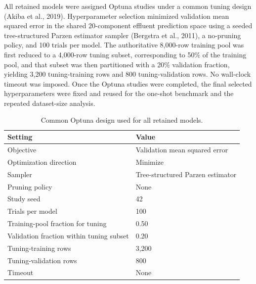 \documentclass[a4paper,fleqn]{cas-sc}
\newenvironment{revblock}{}{}
\newenvironment{revblockr24}{}{}
\begin{document}
\begin{revblock}
\begin{revblockr24}
All retained models were assigned Optuna studies under a common tuning design (Akiba et al., 2019). Hyperparameter selection minimized validation mean squared error in the shared 20-component effluent prediction space using a seeded tree-structured Parzen estimator sampler (Bergstra et al., 2011), a no-pruning policy, and 100 trials per model. The authoritative 8,000-row training pool was first reduced to a 4,000-row tuning subset, corresponding to 50\% of the training pool, and that subset was then partitioned with a 20\% validation fraction, yielding 3,200 tuning-training rows and 800 tuning-validation rows. No wall-clock timeout was imposed. Once the Optuna studies were completed, the final selected hyperparameters were fixed and reused for the one-shot benchmark and the repeated dataset-size analysis.

\begin{table}[H]
\centering
\caption{Common Optuna design used for all retained models.}
\label{tab:optuna_design}
\scriptsize
\begin{tabular}{ll}
\hline
Setting & Value \\
\hline
Objective & Validation mean squared error \\
Optimization direction & Minimize \\
Sampler & Tree-structured Parzen estimator \\
Pruning policy & None \\
Study seed & 42 \\
Trials per model & 100 \\
Training-pool fraction for tuning & 0.50 \\
Validation fraction within tuning subset & 0.20 \\
Tuning-training rows & 3,200 \\
Tuning-validation rows & 800 \\
Timeout & None \\
\hline
\end{tabular}
\end{table}


\end{revblockr24}
\end{revblock}
\end{document}
